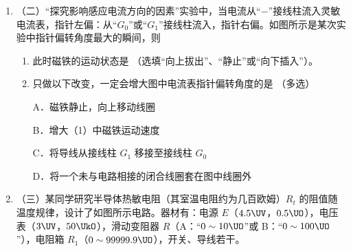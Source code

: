 \documentclass[\gkver]{gaokaozhenti}
\begin{document}
\begin{enumerate}
\item[]
（二）“探究影响感应电流方向的因素”实验中，当电流从“$-$”接线柱流入灵敏电流表，指针左偏：从“$G_{0}$”或“$G_{1}$”接线柱流入，指针右偏。如图所示是某次实验中指针偏转角度最大的瞬间，则

\begin{enumerate}
\item
此时磁铁的运动状态是 （选填“向上拔出”、“静止”或“向下插入”）。

\item
只做以下改变，一定会增大图中电流表指针偏转角度的是 （多选）

A．磁铁静止，向上移动线圈

B．增大（1）中磁铁运动速度

C．将导线从接线柱 $G_{1}$ 移接至接线柱 $G_{0}$

D．将一个未与电路相接的闭合线圈套在图中线圈外
\end{enumerate}



\item[]
（三）某同学研究半导体热敏电阻（其室温电阻约为几百欧姆）$R_{t}$ 的阻值随温度规律，设计了如图所示电路。器材有：电源 $E$（$4.5 \UV$，$0.5 \UO$），电压表（$3 \UV$，$50 \UkO$），滑动变阻器 $R$（A：“$0 \sim 10 \UO$”或 B：“$0 \sim 100 \UO$”），电阻箱 $R_{1}$（$0 \sim 99999.9 \UO$），开关、导线若干。


\end{enumerate}
\end{document}
